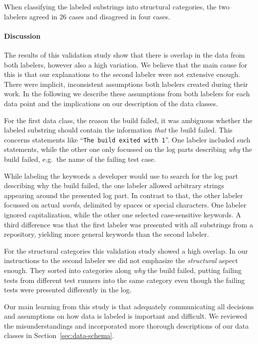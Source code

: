 \documentclass[\myrootdir/main.tex]{subfiles}
\begin{document}
When classifying the labeled substrings into structural categories, the two labelers agreed in 26 cases and disagreed in four cases.

\paragraph{Discussion}
The results of this validation study show that there is overlap in the data from both labelers, however also a high variation.
We believe that the main cause for this is that our explanations to the second labeler were not extensive enough.
There were implicit, inconsistent assumptions both labelers created during their work.
In the following we describe these assumptions from both labelers for each data point and the implications on our description of the data classes.

For the first data class, the reason the build failed, it was ambiguous whether the labeled substring should contain the information \emph{that} the build failed.
This concerns statements like ``\texttt{The build exited with 1}''.
One labeler included such statements, while the other one only focussed on the log parts describing \emph{why} the build failed, e.g.\ the name of the failing test case.

While labeling the keywords a developer would use to search for the log part describing why the build failed, the one labeler allowed arbitrary strings appearing around the presented log part.
In contrast to that, the other labeler focussed on actual \emph{words}, delimited by spaces or special characters.
One labeler ignored capitalization, while the other one selected case-sensitive keywords.
A third difference was that the first labeler was presented with all substrings from a repository, yielding more general keywords than the second labeler.

For the structural categories this validation study showed a high overlap.
In our instructions to the second labeler we did not emphasize the \emph{structural} aspect enough.
They sorted into categories along \emph{why} the build failed, putting failing tests from different test runners into the same category even though the failing tests were presented differently in the log.

Our main learning from this study is that adequately communicating all decisions and assumptions on how data is labeled is important and difficult.
We reviewed the misunderstandings and incorporated more thorough descriptions of our data classes in Section~\ref{sec:data-schema}.
\end{document}
